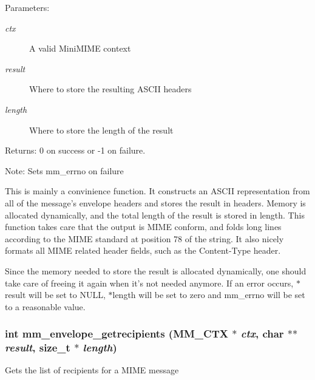 \begin{Desc}
\item[Parameters:]
\begin{description}
\item[{\em ctx}]A valid Mini\-MIME context \item[{\em result}]Where to store the resulting ASCII headers \item[{\em length}]Where to store the length of the result \end{description}
\end{Desc}
\begin{Desc}
\item[Returns:]0 on success or -1 on failure. \end{Desc}
\begin{Desc}
\item[Note:]Sets mm\_\-errno on failure\end{Desc}
This is mainly a convinience function. It constructs an ASCII representation from all of the message's envelope headers and stores the result in headers. Memory is allocated dynamically, and the total length of the result is stored in length. This function takes care that the output is MIME conform, and folds long lines according to the MIME standard at position 78 of the string. It also nicely formats all MIME related header fields, such as the Content-Type header.

Since the memory needed to store the result is allocated dynamically, one should take care of freeing it again when it's not needed anymore. If an error occurs, $\ast$result will be set to NULL, $\ast$length will be set to zero and mm\_\-errno will be set to a reasonable value. 
\subsubsection{\setlength{\rightskip}{0pt plus 5cm}int mm\_\-envelope\_\-getrecipients (MM\_\-CTX $\ast$ {\em ctx}, char $\ast$$\ast$ {\em result}, size\_\-t $\ast$ {\em length})}\label{group__envelope_ge63da17c56867ca2406a4eaf73230baf}


Gets the list of recipients for a MIME message

